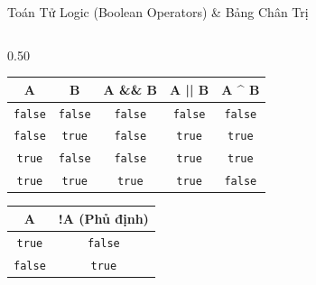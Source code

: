 \documentclass[aspectratio=169, 10pt]{beamer}
\begin{document}
\begin{frame}{Toán Tử Logic (Boolean Operators) \& Bảng Chân Trị}
  \begin{columns}[T]
    \begin{column}{0.50\textwidth}
      \begin{table}[h]
        \centering
        \footnotesize
        \begin{tabular}{c c c c c}
          \toprule
          \textbf{A} & \textbf{B} & \textbf{A \&\& B} & \textbf{A || B} & \textbf{A \textasciicircum{} B} \\
          \midrule
          \texttt{false} & \texttt{false} & \texttt{false} & \texttt{false} & \texttt{false} \\
          \texttt{false} & \texttt{true}  & \texttt{false} & \texttt{true}  & \texttt{true}  \\
          \texttt{true}  & \texttt{false} & \texttt{false} & \texttt{true}  & \texttt{true}  \\
          \texttt{true}  & \texttt{true}  & \texttt{true}  & \texttt{true}  & \texttt{false} \\
          \bottomrule
        \end{tabular}
      \end{table}

      \begin{table}[h]
        \centering
        \footnotesize
        \begin{tabular}{c c}
          \toprule
          \textbf{A} & \textbf{!A (Phủ định)} \\
          \midrule
          \texttt{true} & \texttt{false} \\
          \texttt{false} & \texttt{true} \\
          \bottomrule
        \end{tabular}
      \end{table}
    \end{column}


\end{columns}
\end{frame}
\end{document}
